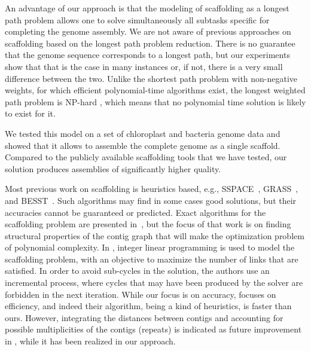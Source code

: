 An advantage of our approach is that the modeling of scaffolding as a longest path problem allows one to solve simultaneously all %
subtasks specific for completing the genome assembly. %
We are not aware of previous approaches on scaffolding based on the longest path problem reduction.  There is no guarantee that the genome sequence corresponds to a longest path, but our experiments show that that is the case in many instances or, if not, there is a very small difference between the two.  Unlike the shortest path problem with non-negative weights, for which efficient polynomial-time algorithms exist,
the longest weighted path problem is NP-hard \cite{Garey:1990:CIG:574848}, which means that no polynomial time solution is likely to exist for it. 

We tested this model on a set of chloroplast and bacteria  genome data  and showed that it allows  to assemble the complete genome as a single scaffold. Compared to the publicly available scaffolding tools that we have tested, our solution produces assemblies of significantly higher quality. 

Most previous work on scaffolding is heuristics based, e.g., SSPACE~\cite{boetzer_scaffolding_2011}, GRASS~\cite{Gritsenko01062012}, and BESST~\cite{BESST}. Such algorithms may find in some cases good solutions, but their accuracies cannot be guaranteed or predicted.  %
Exact algorithms for the scaffolding problem are presented in~\cite{weller2015exact}, but the focus of that work is on finding structural properties of the contig graph that will make the optimization problem of polynomial complexity.  In \cite{ilp_montpellier}, integer linear programming is used to model the scaffolding problem, with an objective  to maximize the number of links that are satisfied.  In order to avoid sub-cycles in the  solution, the authors use 
 an incremental process, where cycles that may have been produced by the solver are forbidden in the next iteration.   %
 While our focus is on accuracy,  \cite{ilp_montpellier} focuses on efficiency, and indeed their algorithm, being a kind of heuristics, is faster than ours. 
However,  integrating the distances between contigs  and  accounting for possible multiplicities of the contigs (repeats) is indicated  as future improvement in 
 \cite{ilp_montpellier},  while it has been realized in our approach. 
 
